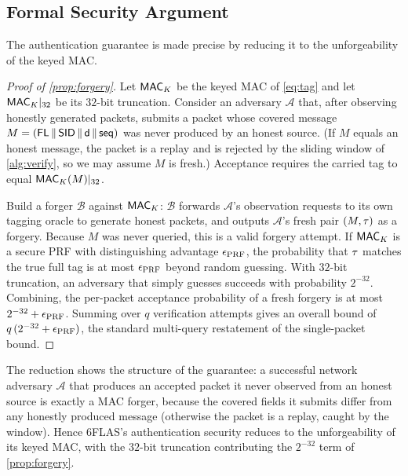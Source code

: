\subsection{Formal Security Argument}
\label{sec:formal}

The authentication guarantee is made precise by reducing it to the
unforgeability of the keyed MAC.

\begin{proof}[Proof of \cref{prop:forgery}]
Let $\textsf{MAC}_{K}$ be the keyed MAC of \cref{eq:tag} and let
$\textsf{MAC}_{K}|_{32}$ be its $32$-bit truncation. Consider an adversary
$\mathcal{A}$ that, after observing honestly generated packets, submits a packet
whose covered message $M=(\mathsf{FL}\,\|\,\textsf{SID}\,\|\,\mathsf{d}\,\|\,\mathsf{seq})$ was never
produced by an honest source. (If $M$ equals an honest message, the packet is a
replay and is rejected by the sliding window of \cref{alg:verify}, so we may
assume $M$ is fresh.) Acceptance requires the carried tag to equal
$\textsf{MAC}_{K}(M)|_{32}$.

Build a forger $\mathcal{B}$ against $\textsf{MAC}_{K}$: $\mathcal{B}$
forwards $\mathcal{A}$'s observation requests to its own tagging oracle to
generate honest packets, and outputs $\mathcal{A}$'s fresh pair
$(M,\tau)$ as a forgery. Because $M$ was never queried, this is a valid forgery
attempt. If $\textsf{MAC}_{K}$ is a secure PRF with distinguishing advantage
$\epsilon_{\operatorname{PRF}}$, the probability that $\tau$ matches the true full tag is at
most $\epsilon_{\operatorname{PRF}}$ beyond random guessing. With $32$-bit truncation, an
adversary that simply guesses succeeds with probability $2^{-32}$. Combining,
the per-packet acceptance probability of a fresh forgery is at most
$2^{-32}+\epsilon_{\operatorname{PRF}}$. Summing over $q$ verification attempts gives an
overall bound of $q\,(2^{-32}+\epsilon_{\operatorname{PRF}})$, the standard multi-query
restatement of the single-packet bound.
\end{proof}

The reduction shows the structure of the guarantee: a successful network
adversary $\mathcal{A}$ that produces an accepted packet it never observed from
an honest source is exactly a MAC forger, because the covered fields it submits
differ from any honestly produced message (otherwise the packet is a replay,
caught by the window). Hence 6FLAS's authentication security reduces to the
unforgeability of its keyed MAC, with the $32$-bit truncation contributing the
$2^{-32}$ term of \cref{prop:forgery}.
